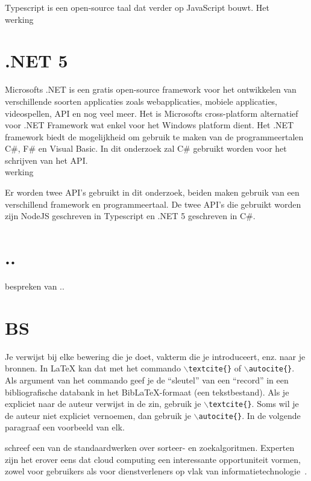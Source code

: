 Typescript is een open-source taal dat verder op JavaScript bouwt. Het 
\\werking
\section{.NET 5}
Microsofts .NET is een gratis open-source framework voor het ontwikkelen van verschillende soorten applicaties zoals webapplicaties, mobiele applicaties, videospellen, API en nog veel meer. Het is Microsofts cross-platform alternatief voor .NET Framework wat enkel voor het Windows platform dient. Het .NET framework biedt de mogelijkheid om gebruik te maken van de programmeertalen C\#, F\# en Visual Basic. In dit onderzoek zal C\# gebruikt worden voor het schrijven van het API.
\\werking

Er worden twee API's gebruikt in dit onderzoek, beiden maken gebruik van een verschillend framework en programmeertaal. 
De twee API's die gebruikt worden zijn NodeJS geschreven in Typescript en .NET 5 geschreven in C\#.

\section{..}
bespreken van ..

\section{BS}
Je verwijst bij elke bewering die je doet, vakterm die je introduceert, enz. naar je bronnen. In \LaTeX{} kan dat met het commando \texttt{$\backslash${textcite\{\}}} of \texttt{$\backslash${autocite\{\}}}. Als argument van het commando geef je de ``sleutel'' van een ``record'' in een bibliografische databank in het Bib\LaTeX{}-formaat (een tekstbestand). Als je expliciet naar de auteur verwijst in de zin, gebruik je \texttt{$\backslash${}textcite\{\}}.
Soms wil je de auteur niet expliciet vernoemen, dan gebruik je \texttt{$\backslash${}autocite\{\}}. In de volgende paragraaf een voorbeeld van elk.

\textcite{Knuth1998} schreef een van de standaardwerken over sorteer- en zoekalgoritmen. Experten zijn het erover eens dat cloud computing een interessante opportuniteit vormen, zowel voor gebruikers als voor dienstverleners op vlak van informatietechnologie~\autocite{Creeger2009}.